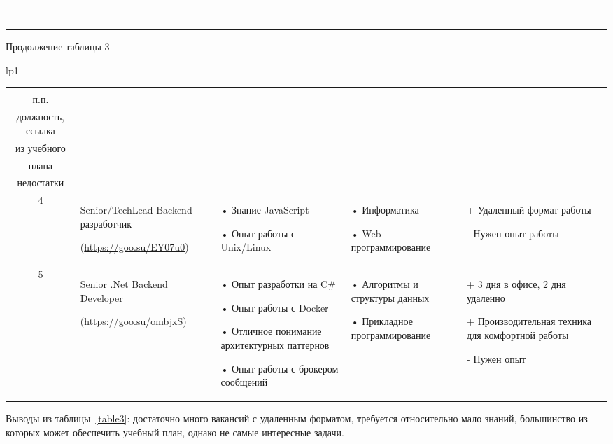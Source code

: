\documentclass[14pt]{extreport}
\begin{document}
\begin{landscape}
\begin{longtable}[H]{lp{1\linewidth}}
\begin{small}
\begin{tabular}{|c|p{}|p{6cm}|p{5cm}|p{5cm}|}
    \end{tabular}
    \end{small}
\end{longtable}

\newpage
Продолжение таблицы 3
\begin{longtable}[H]{lp{1\linewidth}}
\caption{Продолжение таблицы 3}

\centering

\begin{small}


    \begin{tabular}{|c|p{}|p{6cm}|p{5cm}|p{5cm}|}
	\hline 
	\makecell{№ \\ п.п.} &	\makecell{Наименование,\\ должность, ссылка} &	\makecell{Требования} & 	\makecell{Дисциплины \\ из учебного \\плана} &	\makecell{Преимущества и \\недостатки}  \\ 
	\hline 
	4	& Senior/TechLead Backend разработчик
	
(\url{https://goo.su/EY07u0}) &
•	Знание JavaScript

•	Опыт работы с Unix/Linux &
•	Информатика

•	Web-программирование &
+	Удаленный формат работы

-	Нужен опыт работы
\\



	\hline
	5	& Senior .Net Backend Developer
	
(\url{https://goo.su/ombjxS}) &
•	Опыт разработки на C\# 

•	Опыт работы с Docker

•	Отличное понимание архитектурных паттернов 

•	Опыт работы с брокером сообщений &
•	Алгоритмы и структуры данных

•	Прикладное программирование & 
+	3 дня в офисе, 2 дня удаленно
 
+	Производительная техника для комфортной работы

-	Нужен опыт
\\

	\hline 


    \end{tabular}
    \end{small}
\end{longtable}

Выводы из таблицы~\ref{table3}: достаточно много вакансий с удаленным форматом, требуется относительно мало знаний, большинство из которых может обеспечить учебный план, однако не самые интересные задачи. 
\end{landscape}
\end{document}
